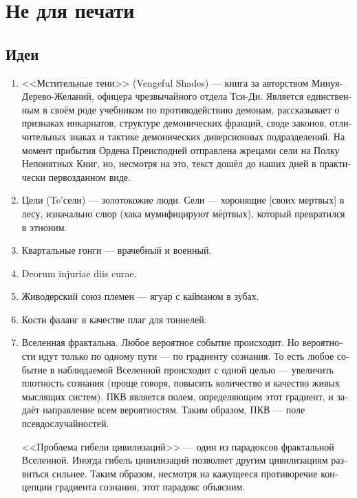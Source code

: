 \documentclass[a4paper,12pt,fleqn]{book}\usepackage{cooltooltips}\usepackage{polyglossia}\setdefaultlanguage[babelshorthands=true]{russian}\setotherlanguage{english}\defaultfontfeatures{Ligatures=TeX,Mapping=tex-text} \usepackage{xcolor}\definecolor{lightgray}{HTML}{bbbbbb}\color{lightgray}\newcommand{\ml}[3]{\textenglish{\textcolor{black}{#3}}}
\begin{document}
{\chapter{Не для печати}

\section{Идеи}

\begin{enumerate}

\item <<Мстительные тени>> (Vengeful Shades) --- книга за авторством Минуя-Дерево-Желаний, офицера чрезвычайного отдела Тси-Ди.
Является единственным в своём роде учебником по противодействию демонам, рассказывает о признаках инкарнатов, структуре демонических фракций, своде законов, отличительных знаках и тактике демонических диверсионных подразделений.
На момент прибытия Ордена Преисподней отправлена жрецами сели на Полку Непонятных Книг, но, несмотря на это, текст дошёл до наших дней в практически первозданном виде.

\item Цели (Te'сели) --- золотокожие люди. Сели --- хоронящие [своих мертвых] в лесу, изначально слюр (хака мумифицируют мёртвых), который превратился в этноним.

\item Квартальные гонги --- врачебный и военный.

\item Deorum injuriae diis curae.

\item Живодерский союз племен --- ягуар с кайманом в зубах.

\item Кости фаланг в качестве плаг для тоннелей.

\item Вселенная фрактальна.
Любое вероятное событие происходит.
Но вероятности идут только по одному пути --- по градиенту сознания.
То есть любое событие в наблюдаемой Вселенной происходит с одной целью --- увеличить плотность сознания (проще говоря, повысить количество и качество живых мыслящих систем).
ПКВ является полем, определяющим этот градиент, и задаёт направление всем вероятностям.
Таким образом, ПКВ --- поле псевдослучайностей.

<<Проблема гибели цивилизаций>> --- один из парадоксов фрактальной Вселенной.
Иногда гибель цивилизаций позволяет другим цивилизациям развиться сильнее.
Таким образом, несмотря на кажущееся противоречие концепции градиента сознания, этот парадокс объясним.


\end{enumerate}}
\end{document}
